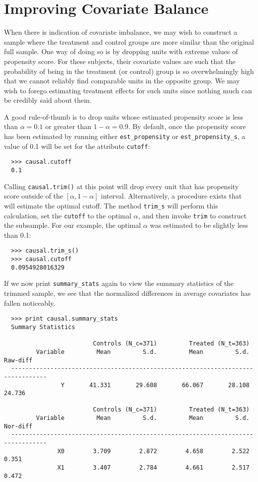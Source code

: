 \documentclass[12pt]{article}
\theoremstyle{definition}
\theoremstyle{definition}
\theoremstyle{definition}
\theoremstyle{remark}
\begin{document}
\section{Improving Covariate Balance} \label{sec.d}

When there is indication of covariate imbalance, we may wish to construct a sample where the treatment and control groups are more similar than the original full sample. One way of doing so is by dropping units with extreme values of propensity score. For these subjects, their covariate values are such that the probability of being in the treatment (or control) group is so overwhelmingly high that we cannot reliably find comparable units in the opposite group. We may wish to forego estimating treatment effects for such units since nothing much can be credibly said about them.

A good rule-of-thumb is to drop units whose estimated propensity score is less than $\alpha=0.1$ or greater than $1-\alpha=0.9$. By default, once the propensity score has been estimated by running either \texttt{est\_propensity} or \texttt{est\_propensity\_s}, a value of 0.1 will be set for the attribute \texttt{cutoff}:

\begin{verbatim}
  >>> causal.cutoff
  0.1
\end{verbatim}

Calling \texttt{causal.trim()} at this point will drop every unit that has propensity score outside of the $[\alpha, 1-\alpha]$ interval. Alternatively, a procedure exists that will estimate the optimal cutoff. The method \texttt{trim\_s} will perform this calculation, set the \texttt{cutoff} to the optimal $\alpha$, and then invoke \texttt{trim} to construct the subsample. For our example, the optimal $\alpha$ was estimated to be slightly less than 0.1:
\begin{verbatim}
  >>> causal.trim_s()
  >>> causal.cutoff
  0.0954928016329
\end{verbatim}

If we now print \texttt{summary\_stats} again to view the summary statistics of the trimmed sample, we see that the normalized differences in average covariates has fallen noticeably.
\begin{verbatim}
  >>> print causal.summary_stats
  Summary Statistics
  
                         Controls (N_c=371)         Treated (N_t=363)             
         Variable         Mean         S.d.         Mean         S.d.     Raw-diff
  --------------------------------------------------------------------------------
                Y       41.331       29.608       66.067       28.108       24.736
  
                         Controls (N_c=371)         Treated (N_t=363)             
         Variable         Mean         S.d.         Mean         S.d.     Nor-diff
  --------------------------------------------------------------------------------
               X0        3.709        2.872        4.658        2.522        0.351
               X1        3.407        2.784        4.661        2.517        0.472
\end{verbatim}
\end{document}
